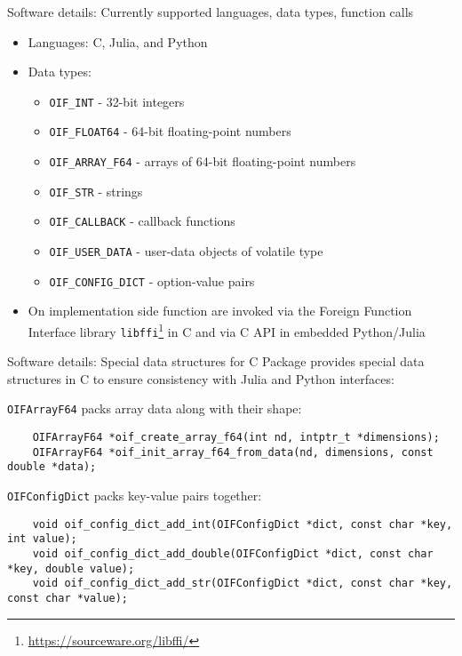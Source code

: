 \documentclass[
  10pt,
  aspectratio=169,
  english,
]{beamer}
\begin{document}
\begin{frame}{Software details: Currently supported languages, data types, function calls}
  \begin{itemize}
    \item Languages: C, Julia, and Python
    \item Data types:
          \begin{itemize}
            \item \texttt{OIF\_INT} - 32-bit integers
            \item \texttt{OIF\_FLOAT64} - 64-bit floating-point numbers
            \item \texttt{OIF\_ARRAY\_F64} - arrays of 64-bit floating-point numbers
            \item \texttt{OIF\_STR} - strings
            \item \texttt{OIF\_CALLBACK} - callback functions
            \item \texttt{OIF\_USER\_DATA} - user-data objects of volatile type
            \item \texttt{OIF\_CONFIG\_DICT} - option-value pairs
          \end{itemize}
    \item On implementation side function are invoked via
          the Foreign Function Interface library \texttt{libffi}\footnote{\url{https://sourceware.org/libffi/}}
          in C and via C API in embedded Python/Julia
  \end{itemize}
\end{frame}

\begin{frame}[fragile]{Software details: Special data structures for C}
  \small Package provides special data structures in C to ensure consistency
  with Julia and Python interfaces:

  \vspace{2em}
  \texttt{OIFArrayF64} packs array data along with their shape:
  \begin{verbatim}
    OIFArrayF64 *oif_create_array_f64(int nd, intptr_t *dimensions);
    OIFArrayF64 *oif_init_array_f64_from_data(nd, dimensions, const double *data);
  \end{verbatim}

  \vspace{2em}
  \texttt{OIFConfigDict} packs key-value pairs together:
  \begin{verbatim}
    void oif_config_dict_add_int(OIFConfigDict *dict, const char *key, int value);
    void oif_config_dict_add_double(OIFConfigDict *dict, const char *key, double value);
    void oif_config_dict_add_str(OIFConfigDict *dict, const char *key, const char *value);
  \end{verbatim}
\end{frame}
\end{document}
